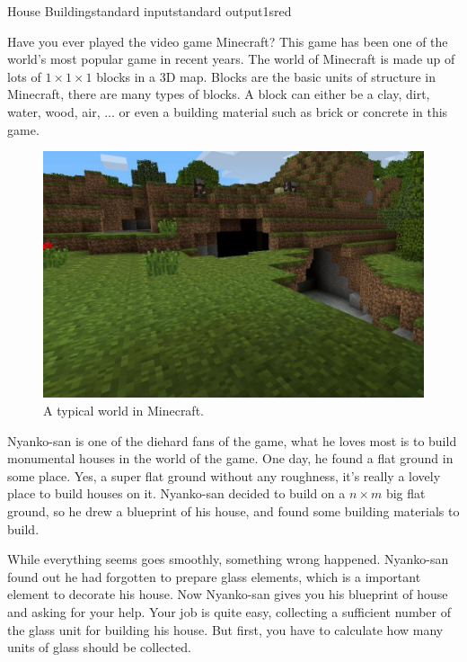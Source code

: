 \begin{problem}{House Building}{standard input}{standard output}{1s}{red}

Have you ever played the video game Minecraft?
This game has been one of the world's most popular game in recent years.
The world of Minecraft is made up of lots of $1 \times 1 \times 1$ blocks in a 3D map.
Blocks are the basic units of structure in Minecraft, there are many types of blocks.
A block can either be a clay, dirt, water, wood, air, ... or even a building material such as brick or concrete in this game.

\begin{figure}[thh!] \begin{center}
\includegraphics[scale=0.3]{minecraft.jpg} 
\caption{A typical world in Minecraft.}
\end{center} \end{figure}

Nyanko-san is one of the diehard fans of the game, what he loves most is to build monumental houses in the world of the game.
One day, he found a flat ground in some place. 
Yes, a super flat ground without any roughness, it's really a lovely place to build houses on it.
Nyanko-san decided to build on a $n \times m$ big flat ground, so he drew a blueprint of his house, and found some building materials to build.

While everything seems goes smoothly, something wrong happened.
Nyanko-san found out he had forgotten to prepare glass elements, which is a important element to decorate his house.
Now Nyanko-san gives you his blueprint of house and asking for your help.
Your job is quite easy, collecting a sufficient number of the glass unit for building his house.
But first, you have to calculate how many units of glass should be collected.


\end{problem}
